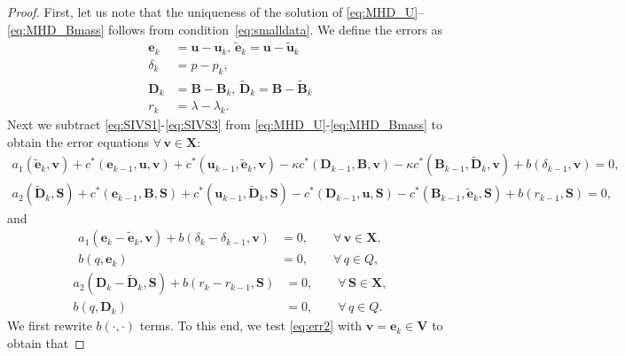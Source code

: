 \documentclass[3p]{elsarticle}
\def\V#1{\mathbf{#1}}
\def\Vt#1{\mathbf{\tilde{#1}}}
\newcommand{\DY}[1]{{\color{black}{#1}}}
\begin{document}
\begin{proof}
First, let us note that the uniqueness of the solution of \eqref{eq:MHD_U}--\eqref{eq:MHD_Bmass} follows from condition~\eqref{eq:smalldata}.
We define the errors as 
\begin{equation}
    \label{eq:err0}
    \begin{aligned}
\V{e}_k & =\V{u}-\V{u}_k, \, \Vt{e}_k=\V{u}-\Vt{u}_k \\
\delta_k & =p-p_k, \\
\V{D}_k & =\V{B}-\V{B}_k, \, \Vt{D}_k=\V{B}-\Vt{B}_k \\
r_k & = \lambda-\lambda_k.
    \end{aligned}
\end{equation}
Next we subtract \eqref{eq:SIVS1}-\eqref{eq:SIVS3} from \eqref{eq:MHD_U}-\eqref{eq:MHD_Bmass} to obtain the error equations $\forall \, \V{v} \in \V{X}$:
\begin{equation}\label{eq:err1}
\begin{aligned}  
a_1(\Vt{e}_{k},\V{v})
+ c^*(\V{e}_{k-1}, \V{u}, \V{v}) + c^*(\V{u}_{k-1}, \Vt{e}_k, \V{v})
- \kappa c^*(\V{D}_{k-1}, \V{B}, \V{v}) - \kappa c^*(\V{B}_{k-1}, \Vt{D}_k, \V{v})
+ b(\delta_{k-1},\V{v}) = 0, \\
a_2(\Vt{D}_{k},\V{S})
+ c^*(\V{e}_{k-1}, \V{B}, \V{S}) + c^*(\V{u}_{k-1}, \Vt{D}_k, \V{S})
- c^*(\V{D}_{k-1}, \V{u}, \V{S}) - c^*(\V{B}_{k-1}, \Vt{e}_k, \V{S})
+ b(r_{k-1},\V{S}) = 0,
\end{aligned}
\end{equation}
and
\begin{equation}\label{eq:err2}
\begin{aligned}
a_1(\V{e}_{k} - \Vt{e}_{k}, \V{v}) + b(\delta_k-\delta_{k-1},\V{v}) & = 0, \qquad \forall \, \V{v} \in \V{X}, \\
b(q, \V{e}_{k}) & = 0, \qquad \forall \, q \in Q,
\end{aligned}
\end{equation}
\begin{equation}\label{eq:err2.5}
\begin{aligned}
a_2(\V{D}_{k} - \Vt{D}_{k}, \V{S}) + b(r_k-r_{k-1},\V{S}) & = 0, \qquad \forall \, \V{S} \in \V{X}, \\
b(q, \V{D}_{k}) & = 0, \qquad \forall \, q \in Q.
\end{aligned}
\end{equation}
We first rewrite $b(\cdot, \cdot)$ terms. To this end, we test \eqref{eq:err2} with $\V{v} = \V{e}_k \in \V{V}$ to obtain that

\end{proof}
\end{document}
